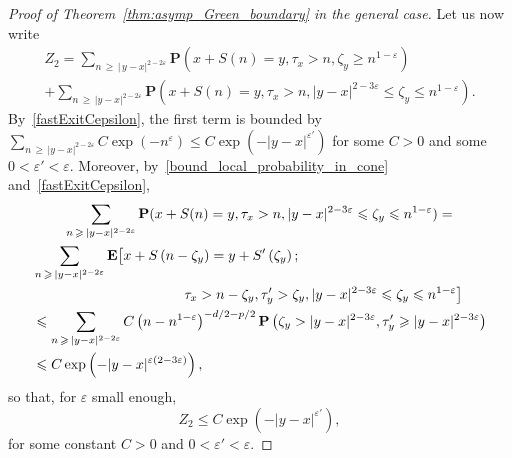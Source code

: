 \documentclass[AHL,Unicode,longabstracts,published]{cedram}
\newcommand{\pr}{\mathbf{P}}
\newcommand{\e}{\mathbf{E}}
\renewcommand{\epsilon}{\varepsilon}
\renewcommand{\leq}{\leqslant}
\renewcommand{\geq}{\geqslant}
\begin{document}
\begin{proof}[Proof of Theorem~\ref{thm:asymp_Green_boundary} in the general case]
Let us now write
\begin{multline*}
Z_{2}=\sum_{n\,\geq\,|\,y-x|^{2-2\epsilon}}\pr\left(x+S(n)=y,\tau_{x}>n,\zeta_{y}\geq n^{1-\epsilon}\right)\\
+\sum_{n\,\geq\,|y-x|^{2-2\epsilon}}\pr\left(x+S(n)=y,\tau_{x}>n,|y-x|^{2-3\epsilon}\leq \zeta_{y}\leq n^{1-\epsilon}\right).
\end{multline*}
By~\eqref{fastExitCepsilon}, the first term is bounded by $\sum_{n\,\geq\,|y-x|^{2-2\epsilon}}C\exp(-n^{\epsilon})\leq C\exp(-| y-x|^{\epsilon'})$ for some $C>0$ and some $0<\epsilon'<\epsilon$. Moreover, by~\eqref{bound_local_probability_in_cone} and~\eqref{fastExitCepsilon},
\begin{multline*}
\sum_{n\,\geq\,|y-x|^{2-2\epsilon}}\pr(x+S(n)=y,\tau_{x}>n,|y-x|^{2-3\epsilon}\leq \zeta_{y}\leq n^{1-\epsilon}) =\\
\begin{aligned}
&\sum_{n\,\geq\,|y-x|^{2-2\epsilon}}\e\big[x+S\left(n-\zeta_{y}\right)
=y+S'\left(\zeta_{y}\right);\\
&\left.\mkern190mu \tau_{x}>n-\zeta_{y},\tau'_{y}>\zeta_{y},| y-x|^{2-3\epsilon}\leq \zeta_{y}\leq n^{1-\epsilon}\right]\\
&\leq\sum_{n\,\geq\,| y-x|^{2-2\epsilon}}C\left(n-n^{1-\epsilon}\right)^{-d/2-p/2}\pr\left(\zeta_{y}>| y-x|^{2-3\epsilon},\tau'_{y} \geq | y-x|^{2-3\epsilon}\right)\\
&\leq C\exp\left(-| y-x|^{\epsilon(2-3\epsilon)}\right),
\end{aligned}
\end{multline*}
so that, for $\epsilon$ small enough,
\[
Z_{2}\leq C\exp\left(-| y-x|^{\epsilon'}\right),
\]
for some constant $C>0$ and $0<\epsilon'<\epsilon$.




\end{proof}
\end{document}
